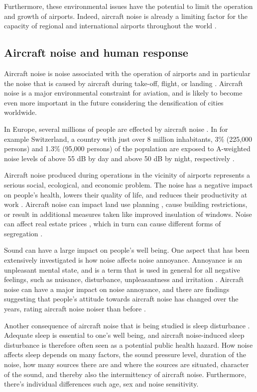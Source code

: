 Furthermore, these environmental issues have the potential to limit the
operation and growth of airports. Indeed, aircraft noise is already a limiting
factor for the capacity of regional and international airports throughout the
world \cite{Zaporozhets2011}.

\subsection*{Aircraft noise and human response}
Aircraft noise is noise associated with the operation of airports and in
particular the noise that is caused by aircraft during take-off, flight, or
landing \cite{Zaporozhets2011}. Aircraft noise is a major environmental
constraint for aviation, and is likely to become even more important in the
future considering the densification of cities worldwide.

In Europe, several millions of people are effected by aircraft noise
\cite{MPDGroupLimited2007}. In for example Switzerland, a country with just over
8 million inhabitants, 3\% (225,000 persons) and 1.3\% (95,000 persons) of the
population are exposed to A-weighted noise levels of above 55 dB by day and above
50 dB by night, respectively \cite{Kirk2009,Schaffer2014}.

Aircraft noise produced during operations in the vicinity of airports represents
a serious social, ecological, and economic problem. The noise has a negative
impact on people's health, lowers their quality of life, and reduces their
productivity at work \cite{Zaporozhets2011}. Aircraft noise can impact land use
planning \cite{Freestone2010}, cause building restrictions, or result
in additional measures taken like improved insulation of windows. Noise can
affect real estate prices \cite{Theebe2004}, which in turn can cause different
forms of segregation \cite{Bjornskau2005}.

Sound can have a large impact on people's well being. One aspect that has been
extensively investigated is how noise affects noise annoyance. Annoyance is an
unpleasant mental state, and is a term that is used in general for all negative
feelings, such as nuisance, disturbance, unpleasantness and irritation
\cite{Guski1999}. Aircraft noise can have a major impact on noise annoyance,
and there are findings suggesting that people's attitude towards aircraft noise
has changed over the years, rating aircraft noise noiser than before \cite{Babisch2009}.

Another consequence of aircraft noise that is being studied is sleep disturbance
\cite{Michaud2007}. Adequate sleep is essential to one's well being, and
aircraft noise-induced sleep disturbance is therefore often seen as a potential
public health hazard.
How noise affects sleep depends on many factors, the sound pressure level,
duration of the noise, how many sources there are and where the sources are situated,
character of the sound, and thereby also the intermittency of aircraft noise.
Furthermore, there's individual differences such age, sex and noise sensitivity.

